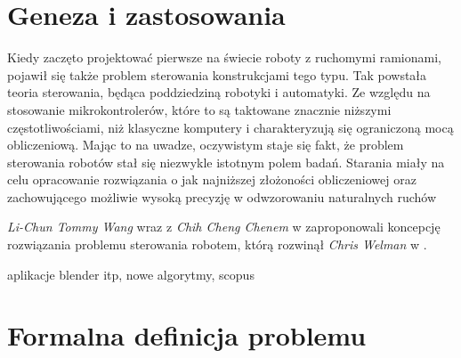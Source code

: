 \documentclass[11pt]{mwrep}
\begin{document}
 



  \section{Geneza i zastosowania}

  Kiedy zaczęto projektować pierwsze na świecie roboty z ruchomymi ramionami, pojawił się także problem sterowania konstrukcjami tego typu. Tak powstała teoria sterowania, będąca poddziedziną robotyki i automatyki. Ze względu na stosowanie mikrokontrolerów, które to są taktowane znacznie niższymi częstotliwościami, niż klasyczne komputery i charakteryzują się ograniczoną mocą obliczeniową. Mając to na uwadze, oczywistym staje się fakt, że problem sterowania robotów stał się niezwykle istotnym polem badań. Starania miały na celu opracowanie rozwiązania o jak najniższej złożoności obliczeniowej oraz zachowującego możliwie wysoką precyzję w odwzorowaniu naturalnych ruchów

  \textit{Li-Chun Tommy Wang} wraz z \textit{Chih Cheng Chenem} w \cite{ikrobot} zaproponowali koncepcję rozwiązania problemu sterowania robotem, którą rozwinął \textit{Chris Welman} w \cite{welman}. 

  aplikacje blender itp, nowe algorytmy, scopus
\section{Formalna definicja problemu}
\end{document}
